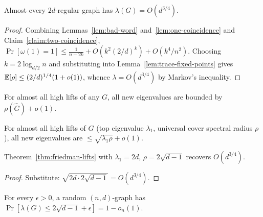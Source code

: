\begin{theorem}
  \label{thm:broder-shamir}
  Almost every $2d$-regular graph has $\lambda(G)=O(d^{3/4})$.
\end{theorem}
\begin{proof}
  Combining Lemmas~\ref{lem:bad-word} and~\ref{lem:one-coincidence} and
  Claim~\ref{claim:two-coincidence},
  $\Pr[\omega(1)=1]\le\frac1{n-2k}+O(k^2(2/d)^k)+O(k^4/n^2)$. Choosing
  $k=2\log_{d/2}n$ and substituting into Lemma~\ref{lem:trace-fixed-points} gives
  $\mathbb{E}[\rho]\le(2/d)^{1/4}(1+o(1))$, whence $\lambda=O(d^{3/4})$ by Markov's
  inequality.
\end{proof}

\begin{theorem}
  \label{conj:friedman}
  \notready
  For almost all high lifts of any $G$, all new eigenvalues are bounded by
  $\rho(\hat G)+o(1)$.
\end{theorem}

\begin{theorem}
  \label{thm:friedman-lifts}
  \notready
  For almost all high lifts of $G$ (top eigenvalue $\lambda_1$, universal cover
  spectral radius $\rho$), all new eigenvalues are $\le\sqrt{\lambda_1\rho}+o(1)$.
\end{theorem}

\begin{corollary}
  \label{cor:friedman-bs}
  Theorem~\ref{thm:friedman-lifts} with $\lambda_1=2d$, $\rho=2\sqrt{d-1}$
  recovers $O(d^{3/4})$.
\end{corollary}
\begin{proof}
  Substitute: $\sqrt{2d\cdot2\sqrt{d-1}}=O(d^{3/4})$.
\end{proof}

\begin{theorem}
  \label{thm:friedman-ramanujan}
  \notready
  For every $\epsilon>0$, a random $(n,d)$-graph has
  $\Pr[\lambda(G)\le2\sqrt{d-1}+\epsilon]=1-o_n(1)$.
\end{theorem}


